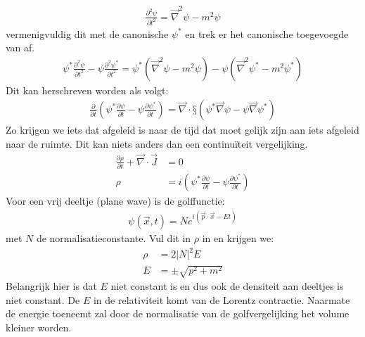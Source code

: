 \documentclass[../main.tex]{subfiles}
\begin{document}
\begin{equation}
    \begin{aligned}
        \label{eq:klein_gordon_eenvoudig_1}
        \frac{\partial^2 \psi}{\partial t^2} = \vec{\nabla}^2 \psi - m^2 \psi
    \end{aligned}
\end{equation}
vermenigvuldig dit met de canonische $\psi^*$ en trek er het canonische toegevoegde van af.
\begin{equation}
    \begin{aligned}
        \label{eq:klein_gordon_eenvoudig_2}
        \psi^*\frac{\partial^2 \psi}{\partial t^2} - \psi\frac{\partial^2 \psi^*}{\partial t^2} = \psi^*(\vec{\nabla}^2 \psi - m^2 \psi) - \psi(\vec{\nabla}^2 \psi^* - m^2 \psi^*)
    \end{aligned}
\end{equation}
Dit kan herschreven worden als volgt:
\begin{equation}
    \begin{aligned}
        \label{eq:klein_gordon_eenvoudig_3}
        \frac{\partial}{\partial t} \left(\psi^*\frac{\partial \psi}{\partial t} - \psi\frac{\partial \psi^*}{\partial t}\right) = \vec{\nabla} \cdot §(\psi^*\vec{\nabla} \psi - \psi\vec{\nabla} \psi^*)
    \end{aligned}
\end{equation}
Zo krijgen we iets dat afgeleid is naar de tijd dat moet gelijk zijn aan iets afgeleid naar de ruimte. Dit kan niets anders dan een continuïteit vergelijking.
\begin{equation}
    \begin{aligned}
        \label{eq:continuiteit_vergelijking}
        \frac{\partial \rho}{\partial t} + \vec{\nabla} \cdot \vec{J} &= 0\\
        \rho &= i\left(\psi^*\frac{\partial \psi}{\partial t} - \psi\frac{\partial \psi^*}{\partial t}\right)
    \end{aligned}
\end{equation}
Voor een vrij deeltje (plane wave) is de golffunctie:
\begin{equation}
    \begin{aligned}
        \label{eq:golffunctie_vrij}
        \psi(\vec{x}, t) = Ne^{i(\vec{p}\cdot \vec{x}-Et)}
    \end{aligned}
\end{equation}
met $N$ de normalisatieconstante. Vul dit in $\rho$ in en krijgen we:
\begin{equation}
    \begin{aligned}
        \label{eq:dens_vrij}
        \rho &= 2|N|^2E\\
        E&=\pm\sqrt{p^2+m^2}
    \end{aligned}
\end{equation}
Belangrijk hier is dat $E$ niet constant is en dus ook de densiteit aan deeltjes is niet constant. De $E$ in de relativiteit komt van de Lorentz contractie. Naarmate de energie toeneemt zal door de normalisatie van de golfvergelijking het volume kleiner worden.
\end{document}

